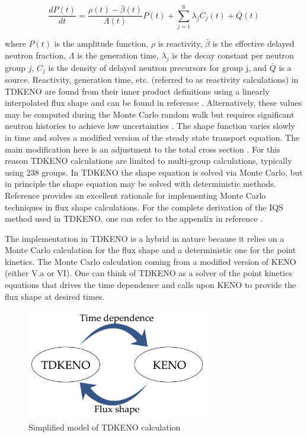 \documentclass[11pt]{article}
\begin{document}
\begin{equation}
    \label{eq:pt_kin}
    \frac{dP(t)}{dt} = \frac{\rho(t)-\bar{\beta}(t)}{\Lambda(t)} P(t) + \sum_{j=1}^{6} \lambda_jC_j(t) + \bar{Q}(t)
\end{equation}

where $P(t)$ is the amplitude function, $\rho$ is reactivity, $\bar{\beta}$ is the effective delayed neutron fraction, $\Lambda$ is the generation time, $\lambda_j$ is the decay constant per neutron group $j$, $C_j$ is the density of delayed neutron precursors for group j, and $\bar{Q}$ is a source.  
 Reactivity, generation time, etc. (referred to as reactivity calculations) in TDKENO are found from their inner product definitions using a linearly interpolated flux shape and can be found in reference \cite{Bentley}.  Alternatively, these values may be computed during the Monte Carlo random walk but requires significant neutron histories to achieve low uncertainties \cite{Waddell}.  The shape function varies slowly in time and solves a modified version of the steady state transport equation.  The main modification here is an adjustment to the total cross section \cite{goluoglu2001time}\cite{Gehin}.  For this reason TDKENO calculations are limited to multi-group calculations, typically using 238 groups.  In TDKENO the shape equation is solved via Monte Carlo, but in principle the shape equation may be solved with deterministic methods.  Reference \cite{Shayesteh} provides an excellent rationale for implementing Monte Carlo techniques in flux shape calculations.  For the complete derivation of the IQS method used in TDKENO, one can refer to the appendix in reference \cite{Bentley}. 
 
 The implementation in TDKENO is a hybrid in nature because it relies on a Monte Carlo calculation for the flux shape and a deterministic one for the point kinetics.  The Monte Carlo calculation coming from a modified version of KENO (either V.a or VI).  One can think of TDKENO as a solver of the point kinetics equations that drives the time dependence and calls upon KENO to provide the flux shape at desired times. 
 \begin{figure}
     \centering
     \includegraphics[width=8cm]{figures/tdkeno_flow.pdf}
     \caption{Simplified model of TDKENO calculation}
     \label{fig:simpletdk}
 \end{figure}
\end{document}
